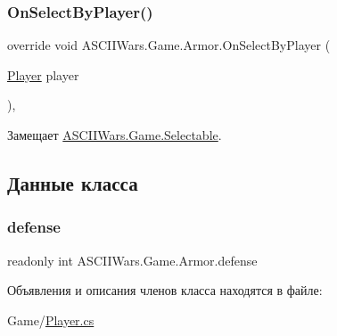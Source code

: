 \subsubsection{\texorpdfstring{On\+Select\+By\+Player()}{OnSelectByPlayer()}}
{\footnotesize\ttfamily override void A\+S\+C\+I\+I\+Wars.\+Game.\+Armor.\+On\+Select\+By\+Player (\begin{DoxyParamCaption}\item[{\hyperlink{class_a_s_c_i_i_wars_1_1_game_1_1_player}{Player}}]{player }\end{DoxyParamCaption})\hspace{0.3cm}{\ttfamily [inline]}, {\ttfamily [virtual]}}



Замещает \hyperlink{class_a_s_c_i_i_wars_1_1_game_1_1_selectable_a95bdcf05ef9ea5f39c81ddd96294968a}{A\+S\+C\+I\+I\+Wars.\+Game.\+Selectable}.



\subsection{Данные класса}
\hypertarget{class_a_s_c_i_i_wars_1_1_game_1_1_armor_ac056d4feeb6864656f00144af7a4ed8b}{}\label{class_a_s_c_i_i_wars_1_1_game_1_1_armor_ac056d4feeb6864656f00144af7a4ed8b} 
\subsubsection{\texorpdfstring{defense}{defense}}
{\footnotesize\ttfamily readonly int A\+S\+C\+I\+I\+Wars.\+Game.\+Armor.\+defense}



Объявления и описания членов класса находятся в файле\+:\begin{DoxyCompactItemize}
\item 
Game/\hyperlink{_player_8cs}{Player.\+cs}\end{DoxyCompactItemize}
